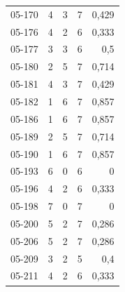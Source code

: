 \begin{longtable}{lrrrr}
05-170 & 4 & 3 & 7 & 0,429\\
05-176 & 4 & 2 & 6 & 0,333\\
05-177 & 3 & 3 & 6 & 0,5\\
05-180 & 2 & 5 & 7 & 0,714\\
05-181 & 4 & 3 & 7 & 0,429\\
05-182 & 1 & 6 & 7 & 0,857\\
05-186 & 1 & 6 & 7 & 0,857\\
05-189 & 2 & 5 & 7 & 0,714\\
05-190 & 1 & 6 & 7 & 0,857\\
05-193 & 6 & 0 & 6 & 0\\
05-196 & 4 & 2 & 6 & 0,333\\
05-198 & 7 & 0 & 7 & 0\\
05-200 & 5 & 2 & 7 & 0,286\\
05-206 & 5 & 2 & 7 & 0,286\\
05-209 & 3 & 2 & 5 & 0,4\\
05-211 & 4 & 2 & 6 & 0,333\\
\bottomrule
\end{longtable}
\endgroup

